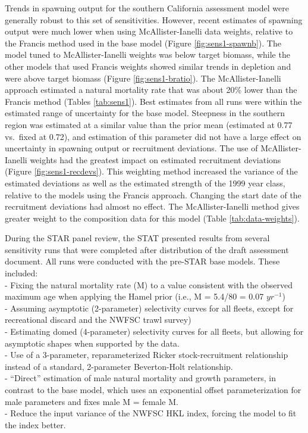 \documentclass[11pt,
  english,
]{article}
\begin{document}
\tagstructend

Trends in spawning output for the southern California assessment model were generally robust to this set of sensitivities. However, recent estimates of spawning output were much lower when using McAllister-Ianelli data weights, relative to the Francis method used in the base model (Figure \ref{fig:sens1-spawnb}). The model tuned to McAllister-Ianelli weights was below target biomass, while the other models that used Francis weights showed similar trends in depletion and were above target biomass (Figure \ref{fig:sens1-bratio}). The McAllister-Ianelli approach estimated a natural mortality rate that was about 20\% lower than the Francis method (Tables \ref{tab:sens1}). Best estimates from all runs were within the estimated range of uncertainty for the base model. Steepness in the southern region was estimated at a similar value than the prior mean (estimated at 0.77 vs.~fixed at 0.72), and estimation of this parameter did not have a large effect on uncertainty in spawning output or recruitment deviations. The use of McAllister-Ianelli weights had the greatest impact on estimated recruitment deviations (Figure \ref{fig:sens1-recdevs}). This weighting method increased the variance of the estimated deviations as well as the estimated strength of the 1999 year class, relative to the models using the Francis approach. Changing the start date of the recruitment deviations had almost no effect. The McAllister-Ianelli method gives greater weight to the composition data for this model (Table \ref{tab:data-weights}).

During the STAR panel review, the STAT presented results from several sensitivity runs that were completed after distribution of the draft assessment document. All runs were conducted with the pre-STAR base models. These included:\\
- Fixing the natural mortality rate (M) to a value consistent with the observed maximum age when applying the Hamel prior (i.e., M = 5.4/80 = 0.07 {\(yr^{-1}\)\leavevmode\tagmcend\tagstructend})\\
- Assuming asymptotic (2-parameter) selectivity curves for all fleets, except for recreational discard and the NWFSC trawl survey)\\
- Estimating domed (4-parameter) selectivity curves for all fleets, but allowing for asymptotic shapes when supported by the data.\\
- Use of a 3-parameter, reparameterized Ricker stock-recruitment relationship instead of a standard, 2-parameter Beverton-Holt relationship.\\
- ``Direct'' estimation of male natural mortality and growth parameters, in contrast to the base model, which uses an exponential offset parameterization for male parameters and fixes male M = female M.\\
- Reduce the input variance of the NWFSC HKL index, forcing the model to fit the index better.
\end{document}

